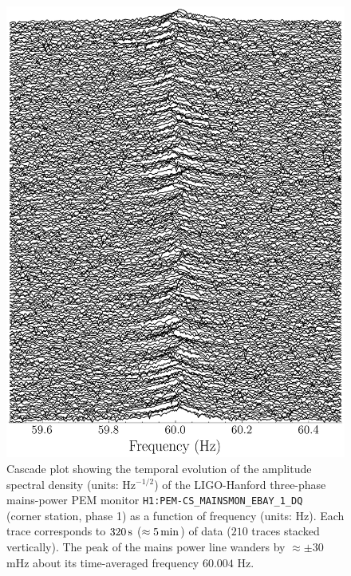 \documentclass[pra,superscriptaddress,reprint,amsmath,amssymb,nofootinbib]{revtex4-2}
\newcommand{\CSOneName}{\texttt{H1:PEM-CS\_MAINSMON\_EBAY\_1\_DQ}}
\begin{document}
\begin{figure}
	\includegraphics[width=\columnwidth]{images/new_cascade_O3_new}
	\caption{Cascade plot showing the temporal evolution of the amplitude spectral density (units: Hz$^{-1/2}$) of the LIGO-Hanford three-phase mains-power PEM monitor \CSOneName~ (corner station, phase 1) as a function of frequency (units: Hz). Each trace corresponds to $320\,{\rm s}$ ($\approx 5\,{\rm min}$) of data ($210$ traces stacked vertically). The peak of the mains power line wanders by $\approx \pm 30$ mHz about its time-averaged frequency $60.004$ Hz.}
	\label{fig:powerCascade}
\end{figure}



\end{document}
